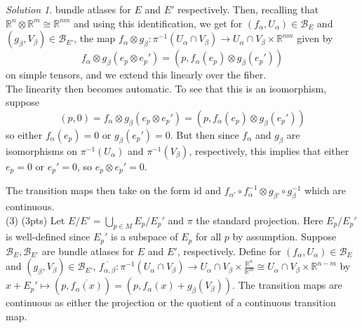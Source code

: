 \documentclass[reqno]{amsart}
\theoremstyle{definition}
\theoremstyle{remark}
\newtheorem*{solution}{Solution}
\newcommand{\id}{{\mathrm{id}}}
\begin{document}
\begin{solution}
     bundle atlases for
     $E$ and  $E'$ respectively.
     Then, recalling that
     $\mathbb{R}^{n} \otimes \mathbb{R}^{m} 
     \cong \mathbb{R}^{nm}$ and using this identification,
     we get 
     for $\left( f_{\alpha},U_{\alpha} \right) 
     \in \mathcal{B}_E$ and
     $\left( g_{\beta}, V_{\beta} \right) \in 
     \mathcal{B}_{E'}$, the map
     $f_{\alpha} \otimes
     g_{\beta} \colon
     \pi^{-1}\left( 
     U_{\alpha} \cap V_{\beta}\right)  \to 
     U_{\alpha} \cap V_{\beta}
     \times \mathbb{R}^{nm}$ given by
     \[
     f_{\alpha}\otimes g_{\beta}
     \left( e_p \otimes e_{p}' \right) 
     = \left( p, f_{\alpha}(e_p) \otimes
     g_{\beta}\left( e_p' \right) \right) 
     \] 
     on simple tensors, and we extend this
     linearly over the fiber.\\
     The linearity then becomes automatic. 
     To see that this is an isomorphism,
     suppose
     \[
         (p,0) = 
     f_{\alpha} \otimes g_{\beta}
     \left( e_p \otimes e_p' \right) 
     = (p, f_{\alpha}(e_p) \otimes g_{\beta}(e_p'))
     \] 
     so either
     $f_{\alpha}(e_p) = 0$ or
     $g_{\beta}(e_p') = 0$. But then since
     $f_{\alpha}$ and $g_{\beta}$ are
     isomorphisms on $\pi^{-1}(U_{\alpha})$ and
     $\pi^{-1}(V_{\beta})$, respectively, this
     implies that either
     $e_p = 0$ or $e_{p}' = 0$, so
     $e_p \otimes e_p' = 0$.

     The transition maps then take on the form
     $\id$ and
     $f_{\alpha '} \circ f_{\alpha}^{-1} 
     \otimes g_{\beta' } \circ g_{\beta}^{-1}$
     which are continuous.\\
     \linebreak
     (3) (3pts) 
     Let
     $E / E' =
     \bigcup_{p \in M} E_p / E_p'$ and
     $\pi$ the standard projection. Here
     $E_p / E_p'$ is well-defined since
     $E_p'$ is a subspace of $E_p$ for all $p$ by
     assumption.
     Suppose
     $ \mathcal{B}_{E}, \mathcal{B}_{E'}$ are
     bundle atlases for
     $E$ and $E'$, respectively.
     Define for $\left( f_{\alpha},U_{\alpha} \right) 
     \in \mathcal{B}_E$ and
     $\left( g_{\beta}, V_{\beta} \right) 
     \in \mathcal{B}_{E'}$, 
     $\overline{f_{\alpha, \beta}} \colon
     \pi^{-1}(U_{\alpha} \cap V_{\beta})
     \to U_{\alpha} \cap V_{\beta}
     \times \frac{\mathbb{R}^{n}}{\mathbb{R}^{m}}
     \cong U_{\alpha} \cap V_{\beta}
     \times \mathbb{R}^{n-m}$ 
     by
     $x + E_{p}' \mapsto 
     \left( p, \overline{f_{\alpha}(x)} \right) =
     \left( p, f_{\alpha}(x) + g_{\beta}(V_{\beta}) \right) $.
     The transition maps are continuous as either the
     projection or the quotient of a continuous transition map.
\end{solution}




\end{document}
